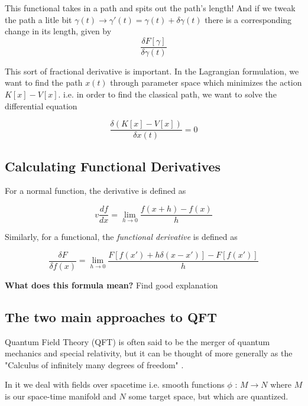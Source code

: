 \documentclass[11pt]{article}
\begin{document}
This functional takes in a path and spits out the path's length! And if we tweak the path a litle bit $\gamma(t) \rightarrow \gamma'(t) = \gamma(t) + \delta \gamma(t)$ there is a corresponding change in its length, given by 
\[ \frac{\delta F[\gamma]}{\delta \gamma(t)} \]

This sort of fractional derivative is important. In the Lagrangian formulation, we want to find the path $x(t)$ through parameter space which minimizes the action $K[x] - V[x]$. i.e. in order to find the classical path, we want to solve the differential equation

\[  \frac{\delta \left(K[x] - V[x]\right)}{\delta x(t)} = 0 \]

\subsection*{Calculating Functional Derivatives}
For a normal function, the derivative is defined as 

\[v \frac{df}{dx} = \lim_{h \rightarrow 0} \frac{f(x + h) - f(x)}{h} \]

Similarly, for a functional, the \emph{functional derivative} is defined as 

\[ \frac{\delta F}{\delta f(x)} = \lim_{h \rightarrow 0} \frac{F[f(x') + h \delta(x - x')] - F[f(x')]}{h} \]

\begin{bluebox}
    \textbf{What does this formula mean?}
    \vskip 0.5cm
    Find good explanation
\end{bluebox}


\vskip 0.5cm
\subsection{The two main approaches to QFT}
Quantum Field Theory (QFT) is often said to be the merger of quantum mechanics and special relativity, but it can be thought of more generally as the "Calculus of infinitely many degrees of freedom" \cite{232AdiscussionNotes}. 

\vskip 0.5cm
In it we deal with fields over spacetime i.e. smooth functions $\phi \text{ : } M \rightarrow N$ where $M$ is our space-time manifold and $N$ some target space, but which are quantized.
\end{document}
